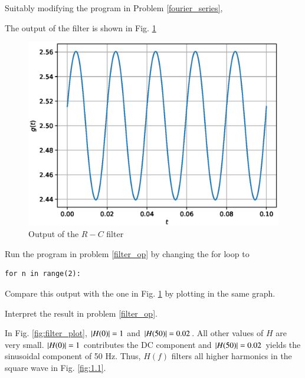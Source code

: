 %
Suitably modifying the program in Problem \ref{fourier_series},
%

%
The output of the filter is shown  in Fig. \ref{fig:2.5}
\begin{figure}[!h]
\centering
\includegraphics[width=\columnwidth]{./chapter2/figs/2.5.eps}
\caption{Output of the $R-C$ filter}
\label{fig:2.5}
\end{figure}
%
\begin{problem}
Run the program in problem \ref{filter_op} by changing the for loop to
\begin{verbatim}
for n in range(2):
\end{verbatim}
Compare this output with the one in Fig. \ref{fig:2.5} by plotting in the same graph.
\end{problem}
\begin{problem}
Interpret the result in problem \ref{filter_op}.
\end{problem}
%
\solution
In Fig. \ref{fig:filter_plot}, $\left\vert H(0)\right\vert = 1$ and $\left\vert H(50)\right\vert = 0.02$.  All other values of $H$ are very small.  $\left\vert H(0)\right\vert = 1$ contributes the DC component and $\left\vert H(50)\right\vert = 0.02$ yields the sinusoidal component of 50 Hz.  Thus, $H(f)$ filters all higher harmonics in the square wave in Fig. \ref{fig:1.1}.
%

